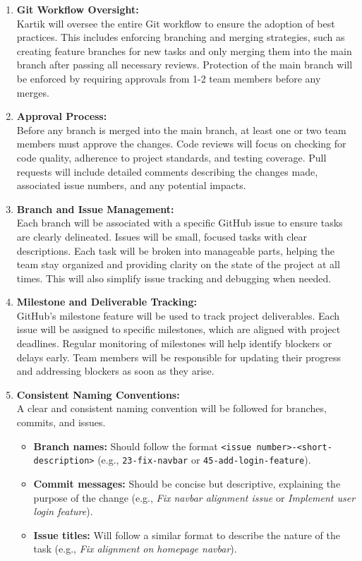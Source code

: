 \documentclass{article}
\begin{document}
\begin{enumerate}
    \item \textbf{Git Workflow Oversight:} \\
    Kartik will oversee the entire Git workflow to ensure the adoption of best practices. This includes enforcing branching and merging strategies, such as creating feature branches for new tasks and only merging them into the main branch after passing all necessary reviews. Protection of the main branch will be enforced by requiring approvals from 1-2 team members before any merges.
    
    \item \textbf{Approval Process:} \\
    Before any branch is merged into the main branch, at least one or two team members must approve the changes. Code reviews will focus on checking for code quality, adherence to project standards, and testing coverage. Pull requests will include detailed comments describing the changes made, associated issue numbers, and any potential impacts.
    
    \item \textbf{Branch and Issue Management:} \\
    Each branch will be associated with a specific GitHub issue to ensure tasks are clearly delineated. Issues will be small, focused tasks with clear descriptions. Each task will be broken into manageable parts, helping the team stay organized and providing clarity on the state of the project at all times. This will also simplify issue tracking and debugging when needed.
    
    \item \textbf{Milestone and Deliverable Tracking:} \\
    GitHub's milestone feature will be used to track project deliverables. Each issue will be assigned to specific milestones, which are aligned with project deadlines. Regular monitoring of milestones will help identify blockers or delays early. Team members will be responsible for updating their progress and addressing blockers as soon as they arise.
    
    \item \textbf{Consistent Naming Conventions:} \\
    A clear and consistent naming convention will be followed for branches, commits, and issues.
    \begin{itemize}
        \item \textbf{Branch names:} Should follow the format \texttt{<issue number>-<short-description>} (e.g., \texttt{23-fix-navbar} or \texttt{45-add-login-feature}).
        \item \textbf{Commit messages:} Should be concise but descriptive, explaining the purpose of the change (e.g., \textit{Fix navbar alignment issue} or \textit{Implement user login feature}).
        \item \textbf{Issue titles:} Will follow a similar format to describe the nature of the task (e.g., \textit{Fix alignment on homepage navbar}).
    \end{itemize}
    

\end{enumerate}
\end{document}
